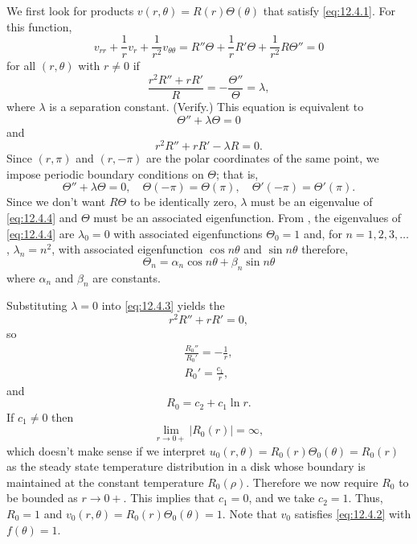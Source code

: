 We first look for products
$v(r,\theta)=R(r)\Theta(\theta)$ that satisfy \eqref{eq:12.4.1}. For
this function,
\[
v_{rr}+\frac{1}{r}v_r+\frac{1}{r^2}v_{\theta\theta}=
R''\Theta+\frac{1}{r}R'\Theta
+\frac{1}{r^2}R\Theta''=0
\]
for all $(r,\theta)$ with $r\ne0$ if
\[
\frac{r^2R''+rR'}{R}=-\frac{\Theta''}{\Theta}=\lambda,
\]
where $\lambda$ is a separation
constant.
(Verify.) This equation is equivalent to
\[
\Theta''+\lambda\Theta=0
\]
and
\begin{equation} \label{eq:12.4.3}
r^2R''+rR'-\lambda R=0.
\end{equation}
Since $(r,\pi)$ and $(r,-\pi)$ are the polar coordinates
of the same point, we impose periodic boundary conditions
on $\Theta$; that is,
\begin{equation} \label{eq:12.4.4}
\Theta''+\lambda\Theta=0,\quad \Theta(-\pi)=\Theta(\pi),
\quad \Theta'(-\pi)=\Theta'(\pi).
\end{equation}
Since we don't want  $R\Theta$ to be identically zero,
$\lambda$ must be an eigenvalue of \eqref{eq:12.4.4} and $\Theta$
must be an associated eigenfunction. From ,
the eigenvalues of \eqref{eq:12.4.4} are $\lambda_0=0$ with
associated eigenfunctions $\Theta_0=1$ and, for $n=1,2,3,\dots$,
$\lambda_n=n^2$,
with associated eigenfunction $\cos n\theta$ and $\sin n\theta$
therefore,
\[
 \Theta_n=\alpha_n\cos n\theta+\beta_n\sin n\theta
\]
where $\alpha_n$ and $\beta_n$ are constants.

Substituting $\lambda=0$ into \eqref{eq:12.4.3} yields the
\[
r^2R''+rR'=0,
\]
so
\begin{gather*}
\frac{R_0''}{R_0'}=-\frac{1}{r},\\
R_0'=\frac{c_1}{r},
\end{gather*}
and
\begin{equation} \label{eq:12.4.5}
R_0=c_2+c_1\ln r.
\end{equation}
If $c_1\ne0$ then
\[
\lim_{r\to0+}|R_0(r)|=\infty,
\]
which doesn't make sense if we interpret
$u_0(r,\theta)=R_0(r)\Theta_0(\theta)=R_0(r)$ as the steady state
temperature distribution in a disk whose boundary is maintained
at the constant temperature $R_0(\rho)$.
Therefore we now require
$R_0$ to be bounded as $r\to0+$.  This implies that $c_1=0$, and
we  take $c_2=1$.
Thus, $R_0=1$ and $v_0(r,\theta)=R_0(r)\Theta_0(\theta)=1$.
Note that $v_0$ satisfies \eqref{eq:12.4.2} with
$f(\theta)=1$.

